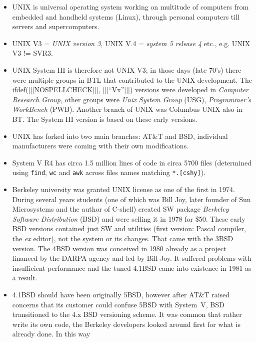 \begin{itemize}
\item UNIX is universal operating system working on multitude of computers from
embedded and handheld systems (Linux), through personal computers till servers
and supercomputers.
\item UNIX V3 = \emph{UNIX version 3}, UNIX V.4 = \emph{system 5 release 4}
etc., e.g. UNIX V3 != SVR3.
\item UNIX System III is therefore not UNIX V3; in those days (late 70's) there
were multiple groups in BTL that contributed to the UNIX development.
The ifdef([[[NOSPELLCHECK]]], [[[``Vx'']]]) versions were developed in
\emph{Computer Research Group}, other groups were \emph{Unix System Group}
(USG), \emph{Programmer's WorkBench} (PWB).
Another branch of UNIX was Columbus UNIX also in BT. The System III version is
based on these early versions.
\item UNIX has forked into two main branches: AT\&T and BSD, individual
manufacturers were coming with their own modifications.
\item System V R4 has circa 1.5 million lines of code
in circa 5700 files (determined using \texttt{find}, \texttt{wc} and
\texttt{awk} across files names matching \texttt{*.[cshy]}).
\item Berkeley university was granted UNIX license as one of the first in
1974. During several years students (one of which was Bill Joy, later
founder of Sun Microsystems and the author of C-shell) created SW package
\emph{Berkeley Software Distribution} (BSD) and were selling it in 1978 for
\$50. These early BSD versions contained just SW and utilities (first version:
Pascal compiler, the \emph{ex} editor), not the system or its changes.
That came with the 3BSD version. The 4BSD version was conceived in 1980 already
as a project financed by the DARPA agency and led by Bill Joy. It suffered
problems with insufficient performance and the tuned 4.1BSD came into existence
in 1981 as a result.
\item 4.1BSD should have been originally 5BSD, however after AT\&T raised
concerns that its customer could confuse 5BSD with System~V, BSD transitioned to
the 4.x BSD versioning scheme. It was common that rather write its own code, the
Berkeley developers looked around first for what is already done. In this way

\end{itemize}
